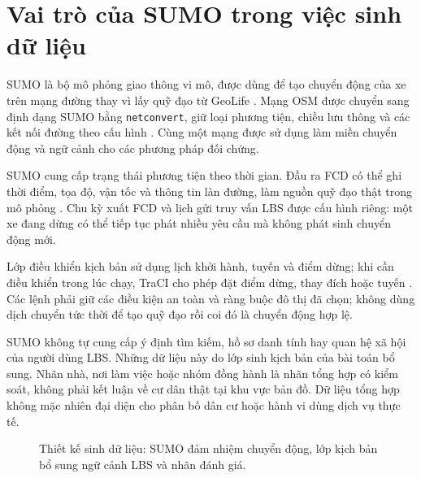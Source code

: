 \documentclass[12pt,a4paper,oneside]{report}
\begin{document}
\clearpage
\section{Vai trò của SUMO trong việc sinh dữ liệu}
\label{sec:sumo-data}

SUMO là bộ mô phỏng giao thông vi mô, được dùng để tạo chuyển động của xe trên mạng đường thay vì lấy quỹ đạo từ GeoLife \citep{sumo2018}. Mạng OSM được chuyển sang định dạng SUMO bằng \texttt{netconvert}, giữ loại phương tiện, chiều lưu thông và các kết nối đường theo cấu hình \citep{sumoosm,osmlicense}. Cùng một mạng được sử dụng làm miền chuyển động và ngữ cảnh cho các phương pháp đối chứng.

SUMO cung cấp trạng thái phương tiện theo thời gian. Đầu ra FCD có thể ghi thời điểm, tọa độ, vận tốc và thông tin làn đường, làm nguồn quỹ đạo thật trong mô phỏng \citep{sumofcd}. Chu kỳ xuất FCD và lịch gửi truy vấn LBS được cấu hình riêng: một xe đang dừng có thể tiếp tục phát nhiều yêu cầu mà không phát sinh chuyển động mới.

Lớp điều khiển kịch bản sử dụng lịch khởi hành, tuyến và điểm dừng; khi cần điều khiển trong lúc chạy, TraCI cho phép đặt điểm dừng, thay đích hoặc tuyến \citep{sumotraci}. Các lệnh phải giữ các điều kiện an toàn và ràng buộc đô thị đã chọn; không dùng dịch chuyển tức thời để tạo quỹ đạo rồi coi đó là chuyển động hợp lệ.

SUMO không tự cung cấp ý định tìm kiếm, hồ sơ danh tính hay quan hệ xã hội của người dùng LBS. Những dữ liệu này do lớp sinh kịch bản của bài toán bổ sung. Nhãn nhà, nơi làm việc hoặc nhóm đồng hành là nhãn tổng hợp có kiểm soát, không phải kết luận về cư dân thật tại khu vực bản đồ. Dữ liệu tổng hợp không mặc nhiên đại diện cho phân bố dân cư hoặc hành vi dùng dịch vụ thực tế.

\begin{figure}[htbp]
\centering
{}
\caption{Thiết kế sinh dữ liệu: SUMO đảm nhiệm chuyển động, lớp kịch bản bổ sung ngữ cảnh LBS và nhãn đánh giá.}
\label{fig:dataset-pipeline}
\end{figure}
\end{document}
